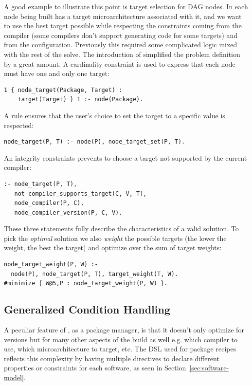 A good example to illustrate this point is target selection for DAG nodes.
In \spack{} each node being built has a target microarchitecture associated with it, and we want to use the best target possible while respecting the constraints coming from the compiler (some compilers don't support generating code for some targets) and from the configuration. 
Previously this required some complicated logic mixed with the rest of the solve.
The introduction of \clingo{} simplified the problem definition by a great amount. A cardinality constraint is used to express that each node must have one and only one target:
\begin{verbatim}
1 { node_target(Package, Target) : 
    target(Target) } 1 :- node(Package).
\end{verbatim}
A rule ensures that the user's choice to set the target to a specific value is respected:
\begin{verbatim}
node_target(P, T) :- node(P), node_target_set(P, T).
\end{verbatim}
An integrity constraints prevents to choose a target not supported by the current compiler:
\begin{verbatim}
:- node_target(P, T),
   not compiler_supports_target(C, V, T),
   node_compiler(P, C),
   node_compiler_version(P, C, V).
\end{verbatim}
These three statements fully describe the characteristics of a valid solution. To pick the \emph{optimal} solution we also \emph{weight} the possible targets
(the lower the weight, the best the target) and optimize over the sum of target weights:
\begin{verbatim}
node_target_weight(P, W) :- 
  node(P), node_target(P, T), target_weight(T, W).
#minimize { W@5,P : node_target_weight(P, W) }.
\end{verbatim}

\subsection{Generalized Condition Handling}
\label{subsec:generalizedcond}
A peculiar feature of \spack, as a package manager, is that it doesn't only optimize for versions but for many other aspects of the build as well e.g. which compiler to use, which microarchitecture to target, etc. 
The DSL used for package recipes reflects this complexity by having multiple directives to declare different properties or constraints for each software, as seen in Section~\ref{sec:software-model}. 

